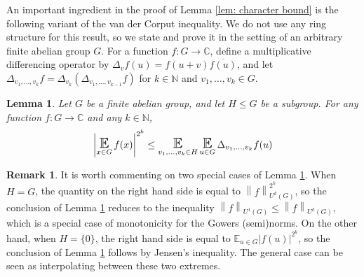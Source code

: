 \documentclass{amsart}
\newtheorem{lemma}[theorem]{Lemma}
\theoremstyle{definition}
\newtheorem{remark}[theorem]{Remark}
\numberwithin{equation}{section}
\newcommand{\N}{\mathbb{N}}
\newcommand{\C}{\mathbb{C}}
\DeclareMathOperator*{\E}{\text{\Large $\mathbb{E}$}}
\newcommand{\norm}[2]{\left\| #2 \right\|_{#1}}
\begin{document}
An important ingredient in the proof of Lemma \ref{lem: character bound} is the following variant of the van der Corput inequality.
We do not use any ring structure for this result, so we state and prove it in the setting of an arbitrary finite abelian group $G$.
For a function $f : G \to \C$, define a multiplicative differencing operator by $\Delta_vf(u) = f(u+v) \overline{f(u)}$,
and let $\Delta_{v_1, \dots, v_k}f = \Delta_{v_k}\left( \Delta_{v_1, \dots, v_{k-1}}f \right)$
for $k \in \N$ and $v_1, \dots, v_k \in G$.

\begin{lemma} \label{lem: vdC}
	Let $G$ be a finite abelian group, and let $H \le G$ be a subgroup.
	For any function $f : G \to \C$ and any $k \in \N$,
	\begin{equation*}
		\left| \E_{x \in G}{f(x)} \right|^{2^k} \le \E_{v_1, \dots, v_k \in H}{\E_{u \in G}{\Delta_{v_1, \dots, v_k}f(u)}}
	\end{equation*}
\end{lemma}

\begin{remark}
	It is worth commenting on two special cases of Lemma \ref{lem: vdC}.
	When $H = G$, the quantity on the right hand side is equal to $\norm{U^k(G)}{f}^{2^k}$, so the conclusion of Lemma \ref{lem: vdC} reduces to the inequality $\norm{U^1(G)}{f} \le \norm{U^k(G)}{f}$, which is a special case of monotonicity for the Gowers (semi)norms.
	On the other hand, when $H = \{0\}$, the right hand side is equal to $\mathbb{E}_{u \in G}{|f(u)|^{2^k}}$, so the conclusion of Lemma \ref{lem: vdC} follows by Jensen's inequality.
	The general case can be seen as interpolating between these two extremes.
\end{remark}
\end{document}
